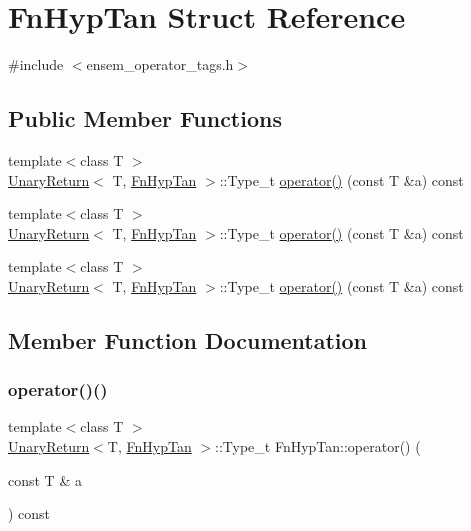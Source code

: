 \hypertarget{structFnHypTan}{}\section{Fn\+Hyp\+Tan Struct Reference}
\label{structFnHypTan}


{\ttfamily \#include $<$ensem\+\_\+operator\+\_\+tags.\+h$>$}

\subsection*{Public Member Functions}
\begin{DoxyCompactItemize}
\item 
{\footnotesize template$<$class T $>$ }\\\mbox{\hyperlink{structUnaryReturn}{Unary\+Return}}$<$ T, \mbox{\hyperlink{structFnHypTan}{Fn\+Hyp\+Tan}} $>$\+::Type\+\_\+t \mbox{\hyperlink{structFnHypTan_a549867ce795e58e29cc5c574347de91b}{operator()}} (const T \&a) const
\item 
{\footnotesize template$<$class T $>$ }\\\mbox{\hyperlink{structUnaryReturn}{Unary\+Return}}$<$ T, \mbox{\hyperlink{structFnHypTan}{Fn\+Hyp\+Tan}} $>$\+::Type\+\_\+t \mbox{\hyperlink{structFnHypTan_a549867ce795e58e29cc5c574347de91b}{operator()}} (const T \&a) const
\item 
{\footnotesize template$<$class T $>$ }\\\mbox{\hyperlink{structUnaryReturn}{Unary\+Return}}$<$ T, \mbox{\hyperlink{structFnHypTan}{Fn\+Hyp\+Tan}} $>$\+::Type\+\_\+t \mbox{\hyperlink{structFnHypTan_a549867ce795e58e29cc5c574347de91b}{operator()}} (const T \&a) const
\end{DoxyCompactItemize}


\subsection{Member Function Documentation}
\mbox{\label{structFnHypTan_a549867ce795e58e29cc5c574347de91b}} 
\subsubsection{\texorpdfstring{operator()()}{operator()()}\hspace{0.1cm}{\footnotesize\ttfamily [1/3]}}
{\footnotesize\ttfamily template$<$class T $>$ \\
\mbox{\hyperlink{structUnaryReturn}{Unary\+Return}}$<$T, \mbox{\hyperlink{structFnHypTan}{Fn\+Hyp\+Tan}} $>$\+::Type\+\_\+t Fn\+Hyp\+Tan\+::operator() (\begin{DoxyParamCaption}\item[{const T \&}]{a }\end{DoxyParamCaption}) const\hspace{0.3cm}{\ttfamily [inline]}}

